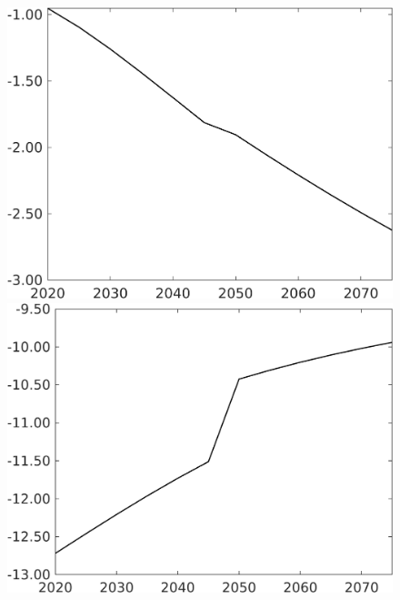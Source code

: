 \documentclass[12pt]{article}
\begin{document}
\begin{figure}[h!!]
\begin{minipage}[]{0.32\textwidth}
	\end{minipage}	
	\begin{minipage}[]{0.32\textwidth}
		\includegraphics[width=1\textwidth]{../../codding_model/own_basedOnFried/optimalPol_010922_revision/figures/all_13Sept22/CompTaufPER_bytaul_Equlab_Reg0_Lf_spillover0_nsk0_xgr0_knspil1_sep1_LFlimit1_emsbase0_countec0_GovRev0_etaa0.79_lgd0.png}
	\end{minipage}		
	\begin{minipage}[]{0.32\textwidth}
		\includegraphics[width=1\textwidth]{../../codding_model/own_basedOnFried/optimalPol_010922_revision/figures/all_13Sept22/CompTaufPER_bytaul_Equlab_Reg0_Lg_spillover0_nsk0_xgr0_knspil1_sep1_LFlimit1_emsbase0_countec0_GovRev0_etaa0.79_lgd0.png}

\end{minipage}
\end{figure}
\end{document}

